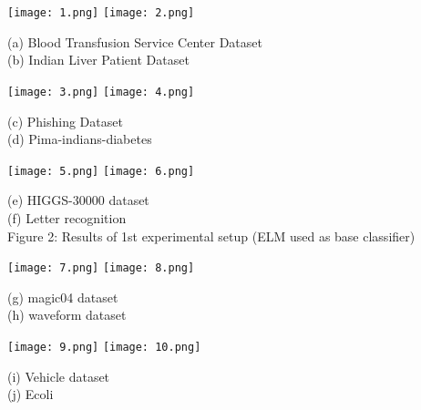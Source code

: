 \documentclass{article}
\begin{document}
		
		
		
		
		
		
		
		
		
		
		\newpage
		
		\texttt{[image: 1.png]}
		\texttt{[image: 2.png]}
		\begin{center}
			\small (a) Blood Transfusion Service Center Dataset\\
			\vspace{0.5em}(b) Indian Liver Patient Dataset
		\end{center}
		
			\vspace{0.9em}
		\texttt{[image: 3.png]}
		\texttt{[image: 4.png]}
		\begin{center}
			\small (c) Phishing Dataset\\
			\vspace{0.5em}(d) Pima-indians-diabetes
		\end{center}
		
			\vspace{0.9em}
		\texttt{[image: 5.png]}
		\texttt{[image: 6.png]}
		\begin{center}
			\small (e) HIGGS-30000 dataset\\
				\vspace{0.5em}(f) Letter recognition \\
			\vspace{0.9em}Figure 2: Results of 1st experimental setup (ELM used as base classifier)
		\end{center}
		
		
		
		\newpage
		\texttt{[image: 7.png]}
		\texttt{[image: 8.png]}
		\begin{center}
			\small (g) magic04 dataset\\
			\vspace{0.5em}(h) waveform dataset
		\end{center}
		
		\vspace{0.9em}
		\texttt{[image: 9.png]}
		\texttt{[image: 10.png]}
		\begin{center}
			\small (i) Vehicle dataset\\
			\vspace{0.5em}(j) Ecoli
		\end{center}
		
\end{document}
